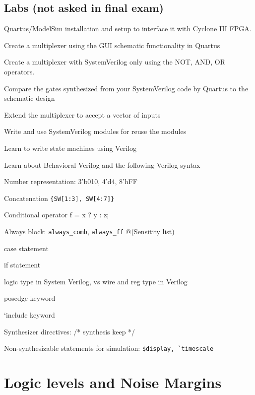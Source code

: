 \documentclass[options]{article}
\newcommand{\cmark}{\ding{51}}%
\newcommand{\done}{\rlap{$\square$}{\raisebox{2pt}{\large\hspace{1pt}\cmark}}%
  \hspace{-2.5pt}}
\begin{document}
\subsection{Labs (not asked in final exam)}
\begin{todolist}
\item[\done] Quartus/ModelSim installation and setup to interface it with Cyclone III FPGA.
\item[\done] Create a multiplexer using the GUI schematic functionality in Quartus
\item[\done] Create a multiplexer with SystemVerilog only using the NOT, AND, OR operators.
\item[\done] Compare the gates synthesized from your SystemVerilog code by Quartus to the schematic design
\item[\done] Extend the multiplexer to accept a vector of inputs
\item[\done] Write and use SystemVerilog modules for reuse the modules
\item[\done] Learn to write state machines using Verilog
\item[\done] Learn about Behavioral Verilog and the following Verilog syntax
  \begin{todolist}
  \item[\done] Number representation: 3’b010, 4’d4, 8’hFF
  \item[\done] Concatenation \verb|{SW[1:3], SW[4:7]}|
  \item[\done] Conditional operator  f = x ? y : z;
  \item[\done] Always block: \verb|always_comb|, \verb|always_ff| @(Sensitity list)
  \item[\done] case statement
  \item[\done] if statement
  \item[\done] logic type in System Verilog, vs wire and reg type in Verilog
  \item[\done] posedge keyword
  \item[\done] `include keyword
  \item[\done] Synthesizer directives: /* synthesis keep */
\item[\done] Non-synthesizable statements for simulation: \verb|$display, `timescale|
  \end{todolist}
\end{todolist}


\newpage
\section{Logic levels and Noise Margins}
\end{document}
